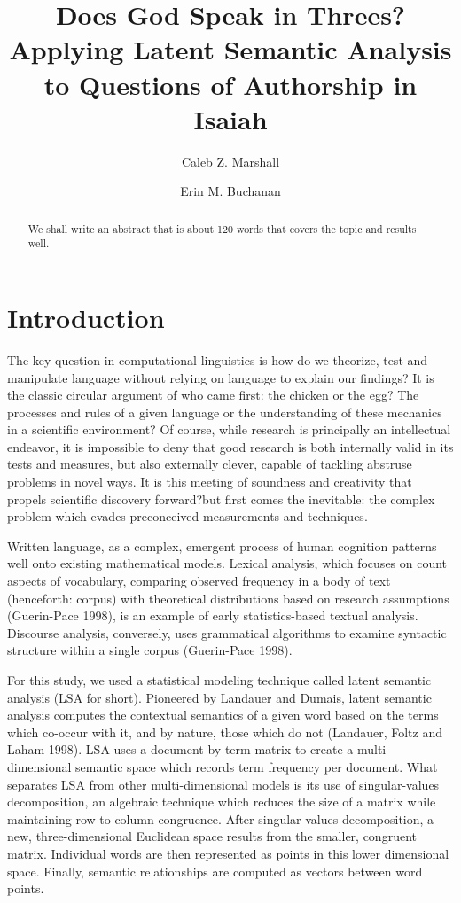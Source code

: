 \documentclass{statsoc}
\title[LSA Applied to Isaiah]{Does God Speak in Threes? Applying Latent Semantic Analysis to Questions of Authorship in Isaiah}
\author[Author 1 {\it et al.}]{Caleb Z. Marshall}
\author{Erin M. Buchanan}
\begin{document}
\begin{abstract}
We shall write an abstract that is about 120 words that covers the topic and results well.
\end{abstract}

\section{Introduction}
The key question in computational linguistics is how do we theorize, test and manipulate language without relying on language to explain our findings? It is the classic circular argument of who came first: the chicken or the egg? The processes and rules of a given language or the understanding of these mechanics in a scientific environment? Of course, while research is principally an intellectual endeavor, it is impossible to deny that good research is both internally valid in its tests and measures, but also externally clever, capable of tackling abstruse problems in novel ways. It is this meeting of soundness and creativity that propels scientific discovery forward?but first comes the inevitable: the complex problem which evades preconceived measurements and techniques. 

Written language, as a complex, emergent process of human cognition patterns well onto existing mathematical models. Lexical analysis, which focuses on count aspects of vocabulary, comparing observed frequency in a body of text (henceforth: corpus) with theoretical distributions based on research assumptions (Guerin-Pace 1998), is an example of early statistics-based textual analysis. Discourse analysis, conversely, uses grammatical algorithms to examine syntactic structure within a single corpus (Guerin-Pace 1998). 

For this study, we used a statistical modeling technique called latent semantic analysis (LSA for short). Pioneered by Landauer and Dumais, latent semantic analysis computes the contextual semantics of a given word based on the terms which co-occur with it, and by nature, those which do not (Landauer, Foltz and Laham 1998). LSA uses a document-by-term matrix to create a multi-dimensional semantic space which records term frequency per document. What separates LSA from other multi-dimensional models is its use of singular-values decomposition, an algebraic technique which reduces the size of a matrix while maintaining row-to-column congruence. After singular values decomposition, a new, three-dimensional Euclidean space results from the smaller, congruent matrix.  Individual words are then represented as points in this lower dimensional space. Finally, semantic relationships are computed as vectors between word points. 
\end{document}
